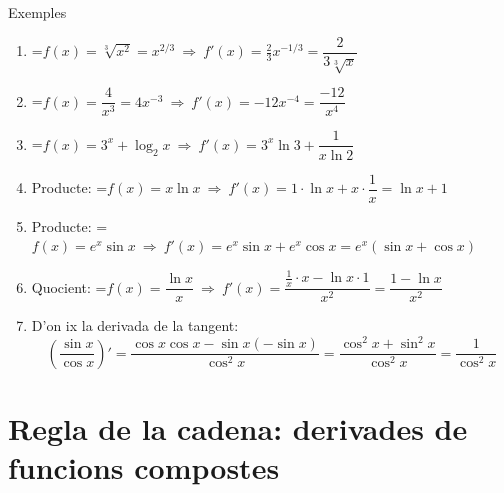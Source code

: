 \documentclass[11pt,a4paper]{article}
\newcommand{\fmm}[1]{\setbox0=\hbox{$#1$}\ifdim\wd0>\linewidth\[#1\]\else\mbox{\box0}\fi}
\begin{document}
  
\begin{fmex}{Exemples}
\begin{enumerate}[label=\textbf{\arabic*.},leftmargin=*]
\item \fmm{f(x)=\sqrt[3]{x^2}=x^{2/3}\ \Rightarrow\ f'(x)=\tfrac23x^{-1/3}=\dfrac{2}{3\sqrt[3]{x}}}
\item \fmm{f(x)=\dfrac{4}{x^3}=4x^{-3}\ \Rightarrow\ f'(x)=-12x^{-4}=\dfrac{-12}{x^4}}
\item \fmm{f(x)=3^x+\log_2x\ \Rightarrow\ f'(x)=3^x\ln3+\dfrac{1}{x\ln2}}
\item Producte: \fmm{f(x)=x\ln x\ \Rightarrow\ f'(x)=1\cdot\ln x+x\cdot\dfrac1x=\ln x+1}
\item Producte: \fmm{f(x)=e^x\sin x\ \Rightarrow\ f'(x)=e^x\sin x+e^x\cos x=e^x(\sin x+\cos x)}
\item Quocient: \fmm{f(x)=\dfrac{\ln x}{x}\ \Rightarrow\ f'(x)=\dfrac{\frac1x\cdot x-\ln x\cdot1}{x^2}=\dfrac{1-\ln x}{x^2}}
\item D'on ix la derivada de la tangent: 
\[\left(\dfrac{\sin x}{\cos x}\right)'=\dfrac{\cos x\cos x-\sin x(-\sin x)}{\cos^2x}=\dfrac{\cos^2x+\sin^2x}{\cos^2x}=\dfrac{1}{\cos^2x}\]

\end{enumerate}
\end{fmex}

  
\section{Regla de la cadena: derivades de funcions compostes}\hypertarget{sec6}{}

  
\end{document}
